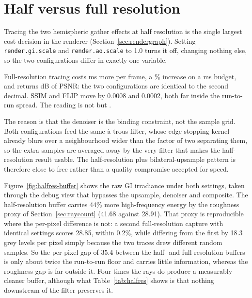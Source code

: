 \section{Half versus full resolution}
\label{sec:halfres}

Tracing the two hemispheric gather effects at half resolution is the single largest cost decision in
the renderer (Section~\ref{sec:rendergraph}). Setting \texttt{render.gi.scale} and \texttt{render.ao.scale} to 1.0 turns it off, changing nothing else, so
the two configurations differ in exactly one variable.

\begin{table}[tbp]
\caption[Half versus full resolution tracing]{Half versus full resolution for GI and AO tracing (RX 9070 XT). Time is the total GPU time of
the \texttt{+gi} configuration, and quality is measured from the atrium viewpoint against the
converged path-traced reference.}
\label{tab:halfres}
\centering

\end{table}

Full-resolution tracing costs \hrDeltaMs{} ms more per frame, a \hrDeltaPct\% increase on a
\hrHalfTotal{} ms budget, and returns \hrPsnrGain{} dB of PSNR: the two configurations are identical
to the second decimal. SSIM and FLIP move by 0.0008 and 0.0002, both far inside the run-to-run
spread. The reading is not  but .

The reason is that the denoiser is the binding constraint, not the sample grid. Both configurations
feed the same à-trous filter, whose edge-stopping kernel already blurs over a neighbourhood wider than
the factor of two separating them, so the extra samples are averaged away by the very filter that makes
the half-resolution result usable. The half-resolution plus bilateral-upsample pattern is therefore
close to free rather than a quality compromise accepted for speed.

Figure~\ref{fig:halfres-buffer} shows the raw GI irradiance under both settings, taken through the
debug view that bypasses the upsample, denoiser and composite. The half-resolution buffer carries
44\% more high-frequency energy by the roughness proxy of Section~\ref{sec:raycount} (41.68
against 28.91). That proxy is reproducible where the per-pixel difference is not: a second
full-resolution capture with identical settings scores 28.85, within 0.2\%, while differing from the
first by 18.3 grey levels per pixel simply because the two traces drew different random samples. So
the per-pixel gap of 35.4 between the half- and full-resolution buffers is only about twice the
run-to-run floor and carries little information, whereas the roughness gap is far outside it. Four
times the rays do produce a measurably cleaner buffer, although what Table~\ref{tab:halfres} shows is that
nothing downstream of the filter preserves it.

